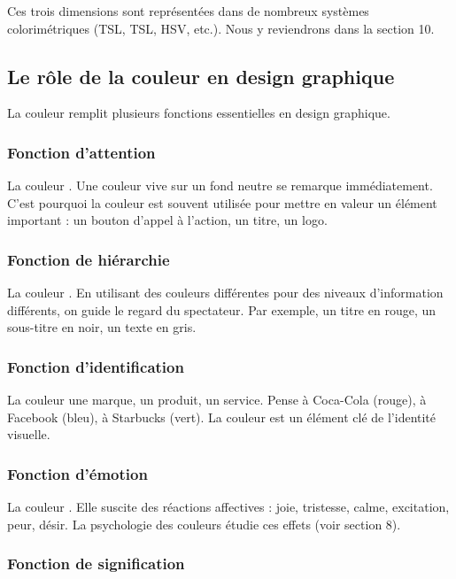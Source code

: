 Ces trois dimensions sont représentées dans de nombreux systèmes colorimétriques (TSL, TSL, HSV, etc.). Nous y reviendrons dans la section 10.

\subsection{Le rôle de la couleur en design graphique}

La couleur remplit plusieurs fonctions essentielles en design graphique.

\subsubsection{Fonction d'attention}

La couleur . Une couleur vive sur un fond neutre se remarque immédiatement. C'est pourquoi la couleur est souvent utilisée pour mettre en valeur un élément important : un bouton d'appel à l'action, un titre, un logo.

\subsubsection{Fonction de hiérarchie}

La couleur . En utilisant des couleurs différentes pour des niveaux d'information différents, on guide le regard du spectateur. Par exemple, un titre en rouge, un sous-titre en noir, un texte en gris.

\subsubsection{Fonction d'identification}

La couleur  une marque, un produit, un service. Pense à Coca-Cola (rouge), à Facebook (bleu), à Starbucks (vert). La couleur est un élément clé de l'identité visuelle.

\subsubsection{Fonction d'émotion}

La couleur . Elle suscite des réactions affectives : joie, tristesse, calme, excitation, peur, désir. La psychologie des couleurs étudie ces effets (voir section 8).

\subsubsection{Fonction de signification}

